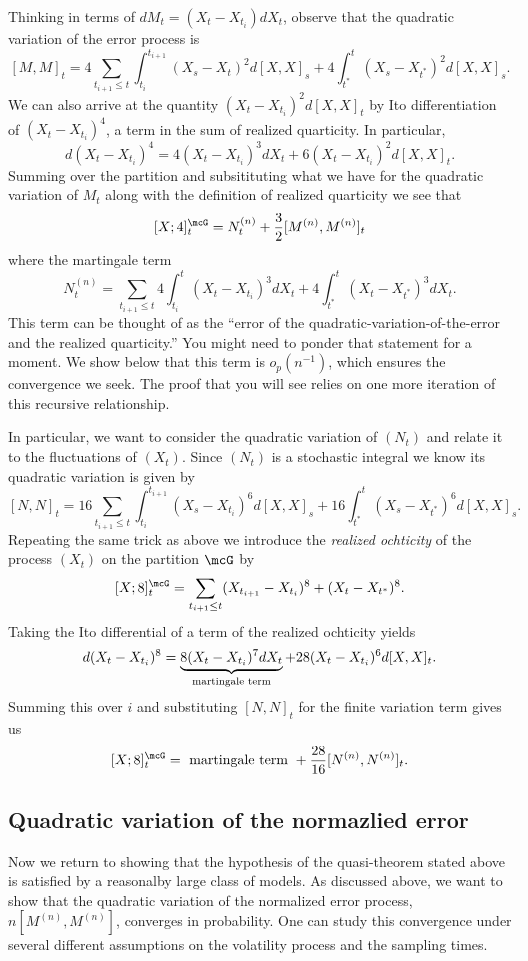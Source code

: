 \documentclass{report}
\begin{document}
Thinking in terms of $dM_t = (X_t - X_{t_i}) dX_t$, observe that the
quadratic variation of the error process is
\[
[M,M]_t = 4 \sum_{t_{i+1} \leq t} \int_{t_i}^{t_{i+1}} (X_s - X_t)^2
d[X,X]_s + 4 \int_{t^*}^t (X_s - X_{t^*})^2 d[X,X]_s.
\]
We can also arrive at the quantity $(X_t - X_{t_i})^2 d[X,X]_t$ by Ito
differentiation of $(X_t - X_{t_i})^4$, a term in the sum of realized
quarticity.  In particular,
\[
d (X_t - X_{t_i})^4 = 4(X_t - X_{t_i})^3 dX_t + 6 (X_t - X_{t_i})^2
d[X,X]_t.
\]
Summing over the partition and subsitituting what we have for the
quadratic variation of $M_t$ along with the definition of realized
quarticity we see that
\[
[X;4]^\mcG_t = N^{(n)}_t + \frac{3}{2} [M^{(n)},M^{(n)}]_t
\]
where the martingale term
\[
N^{(n)}_t =
\sum_{t_{i+1} \leq t} 4 \int_{t_i}^t (X_t - X_{t_i})^3 dX_t +  4
\int_{t^*}^t (X_t - X_{t^*})^3 dX_t.
\]
This term can be thought of as the ``error of the
quadratic-variation-of-the-error and the realized quarticity.''  You
might need to ponder that statement for a moment.  We show below that
this term is $o_p(n^{-1})$, which ensures the convergence we seek. 
The proof that you will see relies on one more iteration of this
recursive relationship.

In particular, we want to consider the quadratic variation of $(N_t)$
and relate it to the fluctuations of $(X_t)$.  Since $(N_t)$ is a
stochastic integral we know its quadratic variation is given by
\[
[N,N]_t = 16 \sum_{t_{i+1} \leq t} \int_{t_i}^{t_{i+1}} (X_s -
X_{t_i})^6 d[X,X]_s + 16 \int_{t^*}^{t} (X_s - X_{t^*})^6 d[X,X]_s.
\]
Repeating the same trick as above we introduce the \emph{realized
ochticity} of the process $(X_t)$ on the partition $\mcG$ by
\[
[X;8]^\mcG_t = \sum_{t_{i+1} \leq t} (X_{t_{i+1}} - X_{t_i})^8 + (X_t
- X_{t^*})^8.
\]
Taking the Ito differential of a term of the realized ochticity yields
\[
d(X_t - X_{t_i})^8 = \underbrace{8 (X_t - X_{t_i})^7
dX_t}_{\textmd{martingale term}} + 28 (X_t - X_{t_i})^6 d[X,X]_t.
\]
Summing this over $i$ and substituting $[N,N]_t$ for the finite
variation term gives us 
\[
[X;8]^\mcG_t = \textmd{ martingale term } + \frac{28}{16}
[N^{(n)},N^{(n)}]_t.
\]

\subsection{Quadratic variation of the normazlied error}

Now we return to showing that the hypothesis of the quasi-theorem
stated above is satisfied by a reasonalby large class of models.  As
discussed above, we want to show that the quadratic variation of the
normalized error process, $n [ M^{(n)}, M^{(n)}]$, converges in
probability.  One can study this convergence under several different
assumptions on the volatility process and the sampling times.
\end{document}
